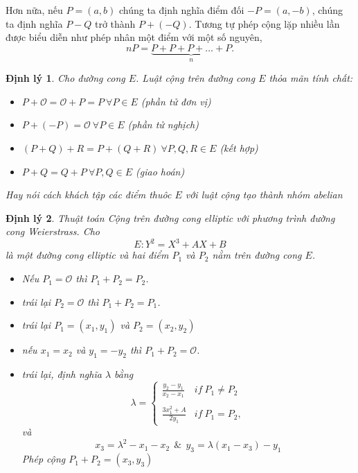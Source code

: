 \documentclass[a4paper,12pt]{report}
\newtheorem{theorem}{Định lý}[chapter]
\begin{document}
Hơn nữa, nếu $P = (a, b)$ chúng ta định nghĩa điểm đối $-P = (a, -b)$, chúng ta định nghĩa $P - Q$ trở thành $P + (-Q)$. Tương tự phép cộng lặp nhiều lần được biểu diễn như phép nhân một điểm với một số nguyên,
\begin{displaymath}
nP = \underbrace{P + P + P + \ldots + P}_{n}.
\end{displaymath}
\begin{theorem} \label{dl2.1}
Cho đường cong $E$. Luật cộng  trên đường cong $E$ thỏa mãn tính chất:
\begin{itemize}
\item[(a)] $P + \mathcal{O} = \mathcal{O} + P = P \ \forall P \in E$ (phần tử đơn vị)
\item[(b)] $P + (-P) = \mathcal{O} \ \forall P \in E$ (phần tử nghịch)
\item[(c)] $(P + Q) + R = P + (Q + R) \ \forall P, Q, R \in E$ (kết hợp)
\item[(d)] $P + Q = Q + P \ \forall P, Q \in E$ (giao hoán) 
\end{itemize}
Hay nói cách khách tập các điểm thuôc $E$ với luật cộng tạo thành nhóm abelian
\end{theorem}
\begin{theorem} \label{dl2.2}
Thuật toán Cộng trên đường cong elliptic với phương trình đường cong Weierstrass. Cho
\begin{displaymath}
E: Y^2 = X^3 + AX + B
\end{displaymath}
là một đường cong elliptic và hai điểm $P_1$ và $P_2$ nằm trên đường cong $E$.
\begin{itemize}
\item[(a)] Nếu $P_1 = \mathcal{O}$ thì $P_1 + P_2 = P_2$.
\item[(b)] trái lại $P_2 = \mathcal{O}$ thì $P_1 + P_2 = P_1$.
\item[(c)] trái lại $P_1 = (x_1, y_1)$ và $P_2 = (x_2, y_2)$
\item[(d)] nếu $x_1 = x_2$ và $y_1 = -y_2$ thì $P_1 + P_2 = \mathcal{O}$.
\item[(e)] trái lại, định nghĩa $\lambda$ bằng
\begin{displaymath}
\lambda = \left\{ \begin{array}{ll}
\displaystyle \frac{y_2 - y_1}{x_2 - x_1} & if \ P_1 \neq P_2  \\
\\
\displaystyle \frac{3x_1^2 + A}{2y_1} & if \ P_1 = P_2,
\end{array} \right.
\end{displaymath}
và
\begin{displaymath}
x_3 = \lambda^2 - x_1 - x_2 \ \ \& \ \ y_3 = \lambda(x_1 - x_3) - y_1
\end{displaymath}
Phép cộng $P_1 + P_2 = (x_3,y_3)$
\end{itemize}
\end{theorem}
\end{document}
